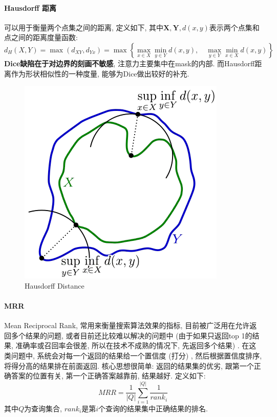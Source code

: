 \paragraph{Hausdorff 距离} 可以用于衡量两个点集之间的距离, 定义如下, 其中$\boldsymbol{X}, \boldsymbol{Y}, d(x, y)$表示两个点集和点之间的距离度量函数: 
$$
d_{H}(X, Y) = \max (d_{X Y}, d_{Y x}) = \max \left\{\underset{x \in X}{\max } \min _{y \in Y}d(x, y),\quad \max _{y \in Y} \min _{x \in X} d(x, y)\right\}
$$
\textbf{Dice缺陷在于对边界的刻画不敏感}, 注意力主要集中在mask的内部. 而Hausdorff距离作为形状相似性的一种度量, 能够为Dice做出较好的补充. 
\begin{figure}[h]
	\centering
	\includegraphics[width=.5\textwidth]{pics/Hausdorff distance.png}
	\caption{Hausdorff Distance}
	\label{fig: hausdorff distance}
\end{figure}

\paragraph{MRR}
Mean Reciprocal Rank, 常用来衡量搜索算法效果的指标, 目前被广泛用在允许返回多个结果的问题, 或者目前还比较难以解决的问题中 (由于如果只返回top 1的结果, 准确率或召回率会很差, 所以在技术不成熟的情况下, 先返回多个结果) . 在这类问题中, 系统会对每一个返回的结果给一个置信度 (打分) , 然后根据置信度排序, 将得分高的结果排在前面返回. 核心思想很简单: 返回的结果集的优劣, 跟第一个正确答案的位置有关, 第一个正确答案越靠前, 结果越好. 定义如下: 
$$
MRR = \frac{1}{|Q|} \sum_{i=1}^{|Q|} \frac{1}{rank_i}
$$
其中$Q$为查询集合, $rank_i$是第$i$个查询的结果集中正确结果的排名. 

